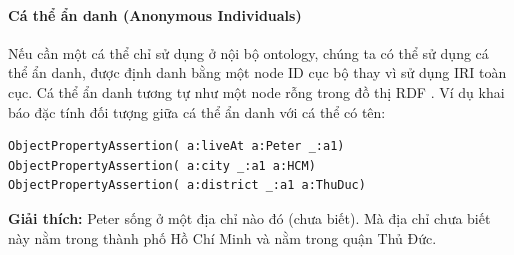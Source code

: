 \paragraph{Cá thể ẩn danh (Anonymous Individuals)} Nếu cần một cá thể chỉ sử dụng ở nội bộ ontology, chúng ta có thể sử dụng cá thể ẩn danh, được định danh bằng một node ID cục bộ thay vì sử dụng IRI toàn cục. Cá thể ẩn danh tương tự như một node rỗng trong đồ thị RDF \cite{rdf_concept}. Ví dụ khai báo đặc tính đối tượng giữa cá thể ẩn danh với cá thể có tên:
\begin{verbatim}
ObjectPropertyAssertion( a:liveAt a:Peter _:a1)
ObjectPropertyAssertion( a:city _:a1 a:HCM)
ObjectPropertyAssertion( a:district _:a1 a:ThuDuc)
\end{verbatim}
\textbf{Giải thích:} Peter sống ở một địa chỉ nào đó (chưa biết). Mà địa chỉ chưa biết này nằm trong thành phố Hồ Chí Minh và nằm trong quận Thủ Đức.



